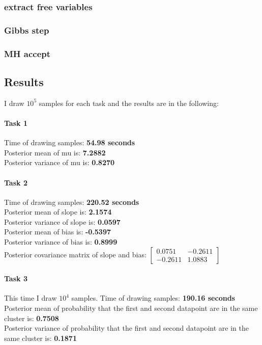 \documentclass{article}
\begin{document}
\subsubsection{extract free variables}

\subsubsection{Gibbs step}

\subsubsection{MH accept}

\subsection{Results}
I draw $10^5$ samples for each task and the results are in the following:
\paragraph{Task 1}
Time of drawing samples: \textbf{54.98 seconds}\\
Posterior mean of mu is: \textbf{7.2882}\\
Posterior variance of mu is: \textbf{0.8270}
\paragraph{Task 2}
Time of drawing samples: \textbf{220.52 seconds}\\
Posterior mean of slope is: \textbf{2.1574}\\
Posterior variance of slope is: \textbf{0.0597}\\
Posterior mean of bias is: \textbf{-0.5397}\\
Posterior variance of bias is: \textbf{0.8999}\\
Posterior covariance matrix of slope and bias:
$\begin{bmatrix}
0.0751 & -0.2611 \\
-0.2611 & 1.0883
\end{bmatrix}$
\paragraph{Task 3}
This time I draw $10^4$ samples.
Time of drawing samples: \textbf{190.16 seconds}\\
Posterior mean of probability that the first and second datapoint are in the same cluster is: \textbf{0.7508}\\
Posterior variance of probability that the first and second datapoint are in the same cluster is: \textbf{0.1871}
\end{document}

